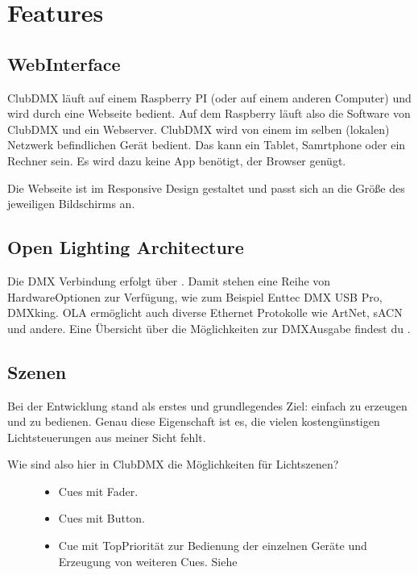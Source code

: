 \documentclass[letterpaper,10pt,ngerman]{sphinxmanual}
\begin{document}
\chapter{Features}
\label{\detokenize{features:features}}\label{\detokenize{features::doc}}

\section{Web\sphinxhyphen{}Interface}
\label{\detokenize{features:web-interface}}
ClubDMX läuft auf einem Raspberry PI (oder auf einem anderen Computer) und
wird durch eine Webseite bedient. Auf dem Raspberry läuft also die Software
von ClubDMX und ein Webserver. ClubDMX wird von einem im selben
(lokalen) Netzwerk befindlichen Gerät bedient. Das kann ein Tablet, Samrtphone
oder ein Rechner sein. Es wird dazu keine App benötigt, der Browser genügt.

Die Webseite ist im Responsive Design gestaltet und passt sich an die
Größe des jeweiligen Bildschirms an.


\section{Open Lighting Architecture}
\label{\detokenize{features:open-lighting-architecture}}
Die DMX Verbindung erfolgt über .
Damit stehen eine Reihe von Hardware\sphinxhyphen{}Optionen zur Verfügung, wie zum Beispiel
Enttec DMX USB Pro, DMXking. OLA ermöglicht auch diverse Ethernet Protokolle
wie ArtNet, sACN und andere. Eine Übersicht über die Möglichkeiten zur
DMX\sphinxhyphen{}Ausgabe findest du .


\section{Szenen}
\label{\detokenize{features:szenen}}
Bei der Entwicklung stand als erstes und grundlegendes Ziel:
 einfach zu erzeugen und zu bedienen. Genau diese
Eigenschaft ist es, die vielen kostengünstigen Lichtsteuerungen
aus meiner Sicht fehlt.
\begin{description}
\item[{Wie sind also hier in ClubDMX die Möglichkeiten für Lichtszenen?}] \leavevmode\begin{itemize}
\item {} 
Cues mit Fader.

\item {} 
Cues mit Button.

\item {} 
Cue mit Top\sphinxhyphen{}Priorität zur Bedienung der einzelnen Geräte und
Erzeugung von weiteren Cues. Siehe {\hyperref[\detokenize{grundlagen:topcuelabel}]{}}

\end{itemize}

\end{description}
\end{document}
